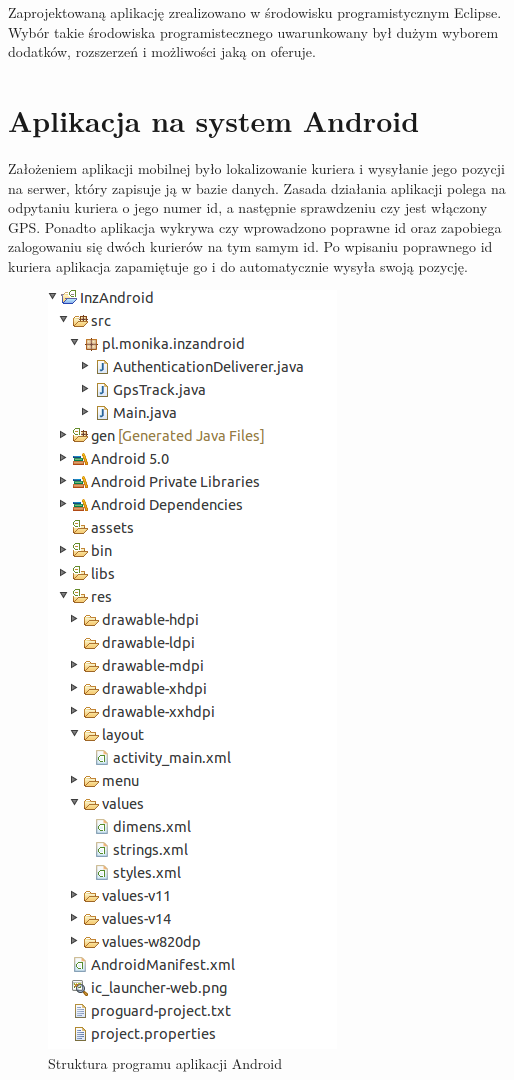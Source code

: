 \documentclass[eng,printmode,oneside]{mgr}
\begin{document}
Zaprojektowaną aplikację zrealizowano w środowisku programistycznym Eclipse.
Wybór takie środowiska programistecznego uwarunkowany był dużym wyborem
dodatków, rozszerzeń i możliwości jaką on oferuje.

\newpage
\section{Aplikacja na system Android}

Założeniem aplikacji mobilnej było lokalizowanie kuriera i wysyłanie jego
pozycji na serwer, który zapisuje ją w bazie danych. Zasada działania aplikacji
polega na odpytaniu kuriera o jego numer id, a następnie sprawdzeniu czy jest
włączony GPS. Ponadto aplikacja wykrywa czy wprowadzono poprawne id oraz
zapobiega zalogowaniu się dwóch kurierów na tym samym id. Po wpisaniu poprawnego
id kuriera aplikacja zapamiętuje go i do automatycznie wysyła swoją pozycję.

\begin{figure}
\centering
\captionsetup{justification=centering,margin=0cm}
\begin{center}
\includegraphics[width=.4\textwidth]{struktura_android.png}
\end{center}
\caption{Struktura programu aplikacji Android}
\label{fig:androidStruktura}
\end{figure}
\end{document}

